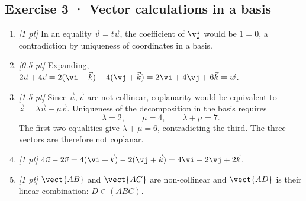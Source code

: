 \subsection*{Exercise 3 · Vector calculations in a basis}\begin{enumerate}

\item \textit{[1 pt]} In an equality $\vec v=t\vec u$, the coefficient of $\vj $ would be $1=0$, a contradiction by uniqueness of coordinates in a basis.

\item \textit{[0.5 pt]} Expanding, $2\vec u+4\vec v=2(\vi +\vec k)+4(\vj +\vec k)=2\vi +4\vj +6\vec k=\vec w$.

\item \textit{[1.5 pt]} Since $\vec u,\vec v$ are not collinear, coplanarity would be equivalent to $\vec z=\lambda\vec u+\mu\vec v$. Uniqueness of the decomposition in the basis requires
\[\lambda=2,\qquad\mu=4,\qquad\lambda+\mu=7.\]
The first two equalities give $\lambda+\mu=6$, contradicting the third. The three vectors are therefore not coplanar.

\item \textit{[1 pt]} $4\vec u-2\vec v=4(\vi +\vec k)-2(\vj +\vec k)=4\vi -2\vj +2\vec k$.

\item \textit{[1 pt]} $\vect{AB}$ and $\vect{AC}$ are non-collinear and $\vect{AD}$ is their linear combination: $D\in(ABC)$.

\end{enumerate}


